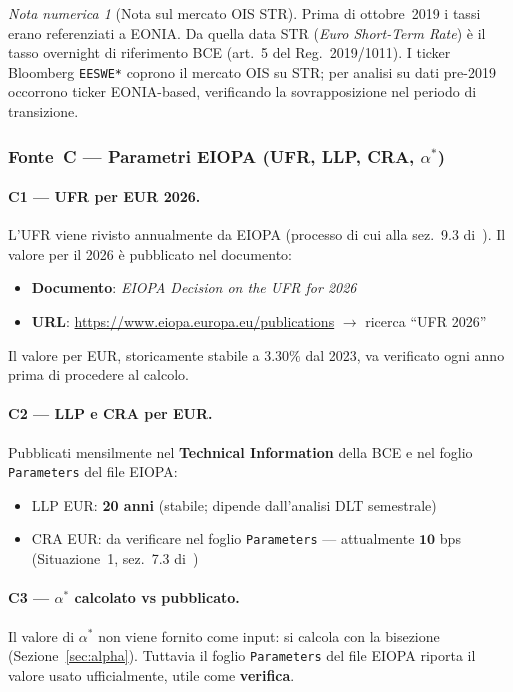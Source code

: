 \documentclass[11pt,a4paper]{article}
\theoremstyle{plain}
\theoremstyle{definition}
\theoremstyle{remark}
\newtheorem*{attenzione}{Nota numerica}
\begin{document}
\begin{attenzione}[Nota sul mercato OIS \texteuro{}STR]
Prima di ottobre~2019 i tassi erano referenziati a EONIA. Da quella data
\texteuro{}STR (\textit{Euro Short-Term Rate}) \`e il tasso overnight di
riferimento BCE (art.~5 del Reg.~2019/1011). I ticker Bloomberg \texttt{EESWE*}
coprono il mercato OIS su \texteuro{}STR; per analisi su dati pre-2019 occorrono
ticker EONIA-based, verificando la sovrapposizione nel periodo di transizione.
\end{attenzione}

\subsubsection*{Fonte~C --- Parametri EIOPA (UFR, LLP, CRA, $\alpha^*$)}

\paragraph{C1 --- UFR per EUR 2026.}
L'UFR viene rivisto annualmente da EIOPA (processo di cui alla sez.~9.3
di~\cite{eiopa2025}). Il valore per il 2026 \`e pubblicato nel documento:
\begin{itemize}
  \item \textbf{Documento}: \emph{EIOPA Decision on the UFR for 2026}
  \item \textbf{URL}: \url{https://www.eiopa.europa.eu/publications} $\to$
        ricerca ``UFR 2026''
\end{itemize}
Il valore per EUR, storicamente stabile a $3.30\%$ dal 2023, va verificato
ogni anno prima di procedere al calcolo.

\paragraph{C2 --- LLP e CRA per EUR.}
Pubblicati mensilmente nel \textbf{Technical Information} della BCE e nel
foglio \texttt{Parameters} del file EIOPA:
\begin{itemize}
  \item LLP EUR: \textbf{20 anni} (stabile; dipende dall'analisi DLT semestrale)
  \item CRA EUR: da verificare nel foglio \texttt{Parameters} ---
        attualmente $\mathbf{10}$ bps (Situazione~1, sez.~7.3 di~\cite{eiopa2025})
\end{itemize}

\paragraph{C3 --- $\alpha^*$ calcolato vs pubblicato.}
Il valore di $\alpha^*$ non viene fornito come input: si calcola con la bisezione
(Sezione~\ref{sec:alpha}). Tuttavia il foglio \texttt{Parameters} del file EIOPA
riporta il valore usato ufficialmente, utile come \textbf{verifica}.
\end{document}

